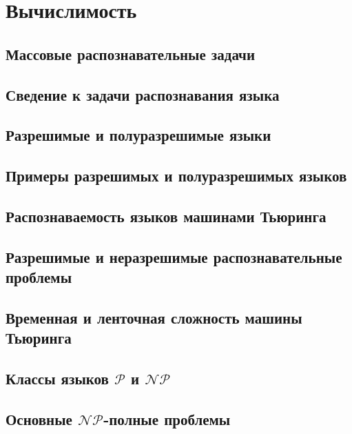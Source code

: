 \section{Вычислимость}
\subsection{Массовые распознавательные задачи}
\subsection{Сведение к задачи распознавания языка}
\subsection{Разрешимые и полуразрешимые языки}
\subsection{Примеры разрешимых и полуразрешимых языков}
\subsection{Распознаваемость языков машинами Тьюринга}
\subsection{Разрешимые и неразрешимые распознавательные проблемы}
\subsection{Временная и ленточная сложность машины Тьюринга}
\subsection{Классы языков $\mathscr{P}$ и $\mathscr{NP}$}
\subsection{Основные $\mathscr{NP}$-полные проблемы}